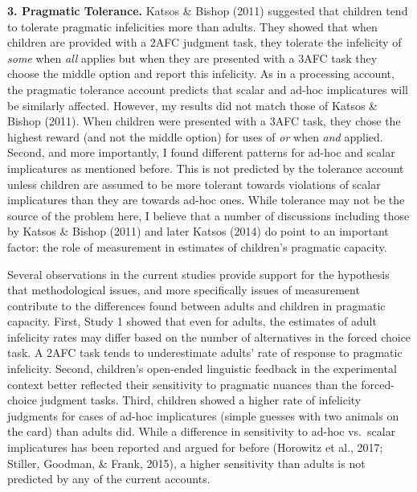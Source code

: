 \documentclass[man]{apa6}
\theoremstyle{definition}
\theoremstyle{definition}
\theoremstyle{definition}
\theoremstyle{remark}
\begin{document}
\textbf{3. Pragmatic Tolerance.} Katsos \& Bishop (2011) suggested that
children tend to tolerate pragmatic infelicities more than adults. They
showed that when children are provided with a 2AFC judgment task, they
tolerate the infelicity of \emph{some} when \emph{all} applies but when
they are presented with a 3AFC task they choose the middle option and
report this infelicity. As in a processing account, the pragmatic
tolerance account predicts that scalar and ad-hoc implicatures will be
similarly affected. However, my results did not match those of Katsos \&
Bishop (2011). When children were presented with a 3AFC task, they chose
the highest reward (and not the middle option) for uses of \emph{or}
when \emph{and} applied. Second, and more importantly, I found different
patterns for ad-hoc and scalar implicatures as mentioned before. This is
not predicted by the tolerance account unless children are assumed to be
more tolerant towards violations of scalar implicatures than they are
towards ad-hoc ones. While tolerance may not be the source of the
problem here, I believe that a number of discussions including those by
Katsos \& Bishop (2011) and later Katsos (2014) do point to an important
factor: the role of measurement in estimates of children's pragmatic
capacity.

Several observations in the current studies provide support for the
hypothesis that methodological issues, and more specifically issues of
measurement contribute to the differences found between adults and
children in pragmatic capacity. First, Study 1 showed that even for
adults, the estimates of adult infelicity rates may differ based on the
number of alternatives in the forced choice task. A 2AFC task tends to
underestimate adults' rate of response to pragmatic infelicity. Second,
children's open-ended linguistic feedback in the experimental context
better reflected their sensitivity to pragmatic nuances than the
forced-choice judgment tasks. Third, children showed a higher rate of
infelicity judgments for cases of ad-hoc implicatures (simple guesses
with two animals on the card) than adults did. While a difference in
sensitivity to ad-hoc vs.~scalar implicatures has been reported and
argued for before (Horowitz et al., 2017; Stiller, Goodman, \& Frank,
2015), a higher sensitivity than adults is not predicted by any of the
current accounts.
\end{document}
